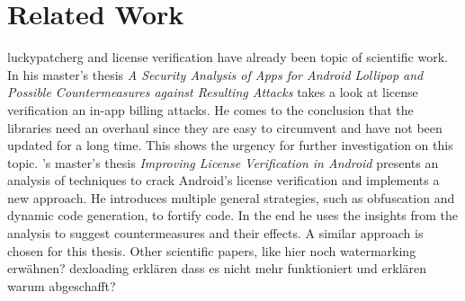 \section{Related Work} \label{subsection:introduction-related}
\gls{luckypatcherg} and license verification have already been topic of scientific work.
\newline
In his master's thesis \textit{A Security Analysis of Apps for Android Lollipop and Possible Countermeasures against Resulting Attacks} \cite{bernhardSecurity} \citeauthor{bernhardSecurity} takes a look at license verification an in-app billing attacks.
He comes to the conclusion that the libraries need an overhaul since they are easy to circumvent and have not been updated for a long time.
This shows the urgency for further investigation on this topic.
\newline
\citeauthor{munteanLicense}'s master's thesis \textit{Improving License Verification in Android} \cite{munteanLicense} presents an analysis of techniques to crack Android's license verification and implements a new approach.
He introduces multiple general strategies, such as obfuscation and dynamic code generation, to fortify code.
In the end he uses the insights from the analysis to suggest countermeasures and their effects.
A similar approach is chosen for this thesis.
\newline
Other scientific papers, like
hier noch watermarking erwähnen?
dexloading erklären dass es nicht mehr funktioniert und erklären warum abgeschafft?
